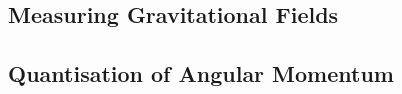 \nocite{wingeier_spherical_2001}


\subsection{Measuring Gravitational Fields}

\subsection{Quantisation of Angular Momentum}
